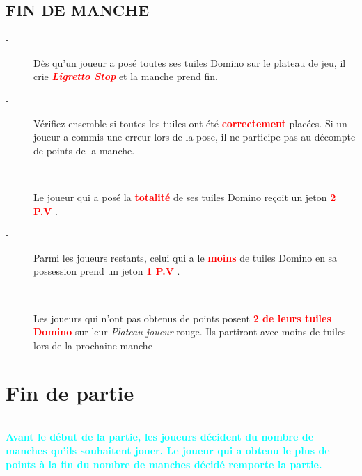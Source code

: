 \documentclass{article}%
\begin{document}
\subsection{ FIN DE MANCHE
}%
\label{subsec:FINDEMANCHE}%
\begin{description}%
\item[{-} ]%
%
 Dès qu’un joueur a posé toutes ses tuiles Domino sur le plateau de jeu, il crie %
\textcolor{red}{\textbf{\textit{Ligretto Stop}}}%
\textit{ }%
 et la manche prend fin.
%
\item[{-} ]%
%
 Vérifiez ensemble si toutes les tuiles ont été %
\textcolor{red}{%
\textbf{correctement}%
}%
\textit{ }%
 placées. Si un joueur a commis une erreur lors de la pose, il ne participe pas au décompte de points de la manche.
%
\item[{-} ]%
%
 Le joueur qui a posé la %
\textcolor{red}{%
\textbf{totalité}%
}%
\textit{ }%
 de ses tuiles Domino reçoit un jeton %
\textcolor{red}{%
\textbf{2 P.V}%
}%
.
%
\item[{-} ]%
%
 Parmi les joueurs restants, celui qui a le %
\textcolor{red}{%
\textbf{moins}%
}%
\textit{ }%
 de tuiles Domino en sa possession prend un jeton %
\textcolor{red}{%
\textbf{1 P.V}%
}%
.
%
\item[{-} ]%
%
 Les joueurs qui n'ont pas obtenus de points posent %
\textcolor{red}{%
\textbf{2 de leurs tuiles Domino}%
}%
\textit{ }%
 sur leur %
\textit{Plateau joueur}%
\textit{ }%
 rouge. Ils partiront avec moins de tuiles lors de la prochaine manche
%
\end{description}

%
\sectionfont{\color{cyan}}%
\subsectionfont{\color{cyan}}%
\subsubsectionfont{\color{cyan}}%
\section{ Fin de partie
}%
\label{sec:Findepartie}%
\textcolor{cyan}{\rule{18cm}{0.07cm}}\break%
\textcolor{cyan}{%
\textbf{Avant le début de la partie, les joueurs décident du nombre de manches qu’ils souhaitent jouer. Le joueur qui a obtenu le plus de points à la fin du nombre de manches décidé remporte la partie.}%
}

%
\end{document}
